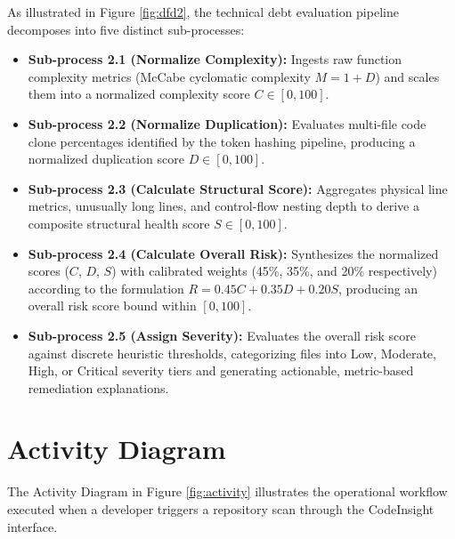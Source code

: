 As illustrated in Figure \ref{fig:dfd2}, the technical debt evaluation pipeline decomposes into five distinct sub-processes:
\begin{itemize}
    \item \textbf{Sub-process 2.1 (Normalize Complexity):} Ingests raw function complexity metrics (McCabe cyclomatic complexity $M = 1 + D$) and scales them into a normalized complexity score $C \in [0, 100]$.
    \item \textbf{Sub-process 2.2 (Normalize Duplication):} Evaluates multi-file code clone percentages identified by the token hashing pipeline, producing a normalized duplication score $D \in [0, 100]$.
    \item \textbf{Sub-process 2.3 (Calculate Structural Score):} Aggregates physical line metrics, unusually long lines, and control-flow nesting depth to derive a composite structural health score $S \in [0, 100]$.
    \item \textbf{Sub-process 2.4 (Calculate Overall Risk):} Synthesizes the normalized scores ($C$, $D$, $S$) with calibrated weights (45\%, 35\%, and 20\% respectively) according to the formulation $R = 0.45C + 0.35D + 0.20S$, producing an overall risk score bound within $[0, 100]$.
    \item \textbf{Sub-process 2.5 (Assign Severity):} Evaluates the overall risk score against discrete heuristic thresholds, categorizing files into Low, Moderate, High, or Critical severity tiers and generating actionable, metric-based remediation explanations.
\end{itemize}

\section{Activity Diagram}
The Activity Diagram in Figure \ref{fig:activity} illustrates the operational workflow executed when a developer triggers a repository scan through the CodeInsight interface.


